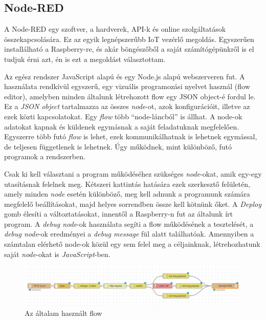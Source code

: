 \documentclass[
]{thesis-ekf}
\theoremstyle{definition}
\theoremstyle{remark}
\begin{document}
\subsection{Node-RED}
A Node-RED egy szoftver, a hardverek, API-k és online szolgáltatások összekapcsolására. Ez az egyik legnépszerűbb IoT vezérlő megoldás. Egyszerűen installálható a Raspberry-re, és akár böngészőből a saját számítógépünkről is el tudjuk érni azt,\cite{nodered-raspberry} én is ezt a megoldást választottam.

Az egész rendszer JavaScript alapú és egy Node.js alapú webszerveren fut. A használata rendkívül egyszerű, egy vizuális programozási nyelvet használ (flow editor), amelyben minden általunk létrehozott flow egy JSON object-é fordul le. Ez a \emph{JSON object} tartalmazza az összes \emph{node}-ot, azok konfigurációit, illetve az ezek közti kapcsolatokat. Egy \emph{flow} több \enquote{node-láncból} is állhat. A node-ok adatokat kapnak és küldenek egymásnak a saját feladatuknak megfelelően. Egyszerre több futó \emph{flow} is lehet, ezek kommunikálhatnak is lehetnek egymással, de teljesen függetlenek is lehetnek. Úgy működnek, mint különböző, futó programok a rendszerben.\cite{node-flow}

Csak ki kell választani a program működéséhez szükséges \emph{node}-okat, amik egy-egy utasításnak felelnek meg. Kétszeri kattintás hatására ezek szerkesztő felületén, amely minden \emph{node} esetén különböző, meg kell adnunk a programunk számára megfelelő beállításokat, majd helyes sorrendben össze kell kötnünk őket. A \emph{Deploy} gomb élesíti a változtatásokat, innentől a Raspberry-n fut az általunk írt program. A \emph{debug node}-ok használata segíti a flow működésének a tesztelését, a \emph{debug node}-ok eredményei a \emph{debug message} fül alatt találhatóak. Amennyiben a számtalan elérhető node-ok közül egy sem felel meg a céljainknak, létrehozhatunk saját \emph{node}-okat is \emph{JavaScript}-ben.

\begin{figure}[ht]
    \centering
    \includegraphics[width=\textwidth, keepaspectratio]{flow.png}
    \caption{Az általam használt flow}
    \label{fig:flow-picture}
\end{figure}
\end{document}
